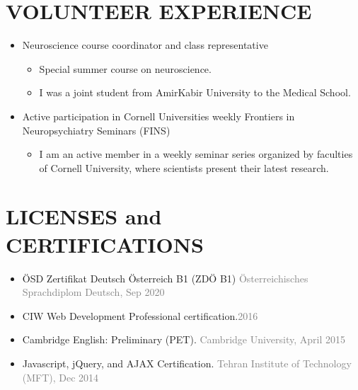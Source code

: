 \documentclass[10pt,a4paper,sans]{moderncv} %
\begin{document}
	\section{VOLUNTEER EXPERIENCE}
    \vspace{0.3em}
	\begin{itemize}
		\item Neuroscience course coordinator and class representative
		\begin{itemize}
			\item Special summer course on neuroscience.
			\item I was a joint student from AmirKabir University to the Medical School.
		\end{itemize}
		\item Active participation in Cornell Universities weekly Frontiers in Neuropsychiatry Seminars (FINS)
		\begin{itemize}
			\item I am an active member in a weekly seminar series organized by faculties of Cornell University, where scientists present their latest research.
		\end{itemize}
	\end{itemize}

	\section{LICENSES and CERTIFICATIONS}
    \vspace{0.3em}
	\begin{itemize}
        \item ÖSD Zertifikat Deutsch Österreich B1 (ZDÖ B1) \textcolor{gray}{Österreichisches Sprachdiplom Deutsch, Sep 2020}
        \item CIW Web Development Professional certification.\textcolor{gray}{2016}
		\item Cambridge English: Preliminary (PET). \textcolor{gray}{ Cambridge University, April 2015 }
		\item Javascript, jQuery, and AJAX Certification.\textcolor{gray}{ Tehran Institute of Technology (MFT), Dec 2014 }
	\end{itemize}

\end{document}

